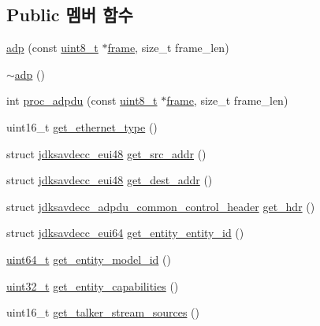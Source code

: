 \subsection*{Public 멤버 함수}
\begin{DoxyCompactItemize}
\item 
\hyperlink{classavdecc__lib_1_1adp_a697b1c432340d54d1787167c2a376709}{adp} (const \hyperlink{stdint_8h_aba7bc1797add20fe3efdf37ced1182c5}{uint8\+\_\+t} $\ast$\hyperlink{gst__avb__playbin_8c_ac8e710e0b5e994c0545d75d69868c6f0}{frame}, size\+\_\+t frame\+\_\+len)
\item 
\hyperlink{classavdecc__lib_1_1adp_abb01c300ced821d93de3dde8f1b4f7c8}{$\sim$adp} ()
\item 
int \hyperlink{classavdecc__lib_1_1adp_aa01b5685d3561b5c20763cad1a42f8a9}{proc\+\_\+adpdu} (const \hyperlink{stdint_8h_aba7bc1797add20fe3efdf37ced1182c5}{uint8\+\_\+t} $\ast$\hyperlink{gst__avb__playbin_8c_ac8e710e0b5e994c0545d75d69868c6f0}{frame}, size\+\_\+t frame\+\_\+len)
\item 
uint16\+\_\+t \hyperlink{classavdecc__lib_1_1adp_a8d80f20d1a51f7ce1c3bf10baffd705f}{get\+\_\+ethernet\+\_\+type} ()
\item 
struct \hyperlink{structjdksavdecc__eui48}{jdksavdecc\+\_\+eui48} \hyperlink{classavdecc__lib_1_1adp_ab8b2f825ae066d2064b2589a80a9e5a3}{get\+\_\+src\+\_\+addr} ()
\item 
struct \hyperlink{structjdksavdecc__eui48}{jdksavdecc\+\_\+eui48} \hyperlink{classavdecc__lib_1_1adp_acd2c72f5e33da965984d9b668fceca73}{get\+\_\+dest\+\_\+addr} ()
\item 
struct \hyperlink{structjdksavdecc__adpdu__common__control__header}{jdksavdecc\+\_\+adpdu\+\_\+common\+\_\+control\+\_\+header} \hyperlink{classavdecc__lib_1_1adp_ad88ea20c34a3236525cd8fd704bcf51e}{get\+\_\+hdr} ()
\item 
struct \hyperlink{structjdksavdecc__eui64}{jdksavdecc\+\_\+eui64} \hyperlink{classavdecc__lib_1_1adp_a7be0469ca6e8e700bde8d2c2b084fa49}{get\+\_\+entity\+\_\+entity\+\_\+id} ()
\item 
\hyperlink{parse_8c_aec6fcb673ff035718c238c8c9d544c47}{uint64\+\_\+t} \hyperlink{classavdecc__lib_1_1adp_ad4d15dcfefaeb3a0da7d25ddfa718ba8}{get\+\_\+entity\+\_\+model\+\_\+id} ()
\item 
\hyperlink{parse_8c_a6eb1e68cc391dd753bc8ce896dbb8315}{uint32\+\_\+t} \hyperlink{classavdecc__lib_1_1adp_abc6a0ce7b62730f17a32b469e8ef0575}{get\+\_\+entity\+\_\+capabilities} ()
\item 
uint16\+\_\+t \hyperlink{classavdecc__lib_1_1adp_a0e9201a363d291e3a84cdc8d366a4ae7}{get\+\_\+talker\+\_\+stream\+\_\+sources} ()

\end{DoxyCompactItemize}

